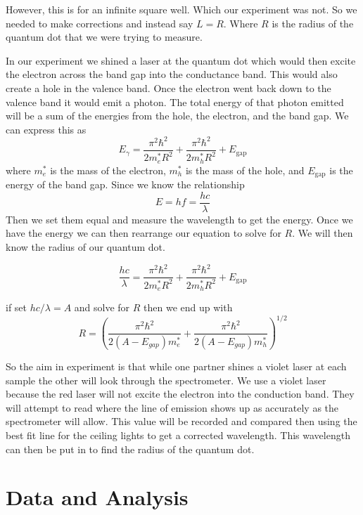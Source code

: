 \documentclass[12pt letterpaper]{article}
\begin{document}
However, this is for an infinite square well. Which our experiment was not. So we needed to make corrections and instead say $L = R$. Where $R$ is the radius of the quantum dot that we were trying to measure. 

In our experiment we shined a laser at the quantum dot which would then excite the electron across the band gap into the conductance band. This would also create a hole in the valence band. Once the electron went back down to the valence band it would emit a photon. The total energy of that photon emitted will be a sum of the energies from the hole, the electron, and the band gap. We can express this as 
\begin{equation}
\label{gamma_energy}
E_{\gamma} = \frac{\pi^2 \hbar^2}{2 m_e^* R^2} + \frac{\pi^2 \hbar^2}{2 m_h^* R^2} + E_{\mathrm{gap}}
\end{equation}
where $m_e^*$ is the mass of the electron, $m_h^*$ is the mass of the hole, and $E_{\mathrm{gap}}$ is the energy of the band gap. Since we know the relationship
\begin{equation}
\label{energy} 
E = hf = \frac{h c}{\lambda}
\end{equation}
Then we set them equal and measure the wavelength to get the energy. Once we have the energy we can then rearrange our equation to solve for $R$. We will then know the radius of our quantum dot. 

$$
\frac{h c}{\lambda} = \frac{\pi^2 \hbar^2}{2 m_e^* R^2} + \frac{\pi^2 \hbar^2}{2 m_h^* R^2} + E_{\mathrm{gap}}
$$

if set $ hc / \lambda = A $ and solve for $R$ then we end up with 
\begin{equation}
\label{radius}
R = \left( \frac{\pi^2 \hbar^2}{2(A-E_{gap}) m_e^*} + \frac{\pi^2 \hbar^2}{2(A-E_{gap}) m_h^*} \right)^{1/2}
\end{equation}

So the aim in experiment is that while one partner shines a violet laser at each sample the other will look through the spectrometer. We use a violet laser because the red laser will not excite the electron into the conduction band. They will attempt to read where the line of emission shows up as accurately as the spectrometer will allow. This value will be recorded and compared then using the best fit line for the ceiling lights to get a corrected wavelength. This wavelength can then be put in to find the radius of the quantum dot. 


\section*{Data and Analysis}
\end{document}
